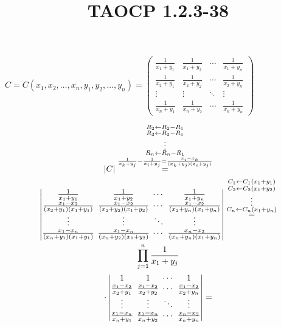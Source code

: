 \documentclass{article}
\title{TAOCP 1.2.3\mbox{-}38}
\begin{document}
\maketitle

\( C = C(x_{1},x_{2},\ldots,x_{n},y_{1},y_{2},\ldots,y_{n}) = \left(\begin{matrix} \frac{1}{x_{1}+y_{1}} & \frac{1}{x_{1}+y_{2}} & \cdots & \frac{1}{x_{1}+y_{n}} \\ \frac{1}{x_{2}+y_{1}} & \frac{1}{x_{2}+y_{2}} & \cdots & \frac{1}{x_{2}+y_{n}} \\ \vdots & \vdots & \ddots & \vdots \\ \frac{1}{x_{n}+y_{1}} & \frac{1}{x_{n}+y_{2}} & \cdots & \frac{1}{x_{n}+y_{n}} \end{matrix}\right) \)

\begin{multline*}
|C| \overset{\substack{R_{2} \leftarrow R_{2} - R_{1}\\R_{3} \leftarrow R_{3} - R_{1} \\ \vdots \\ R_{n} \leftarrow R_{n} - R_{1} \\ \frac{1}{x_{k} + y_{j}} - \frac{1}{x_{i} + y_{j}} = \frac{x_{i}-x_{k}}{(x_{k} + y_{j})(x_{i} + y_{j})}}}{=} \\
\left|\setlength{\arraycolsep}{2pt}\begin{matrix} \frac{1}{x_{1}+y_{1}} & \frac{1}{x_{1}+y_{2}} & \cdots & \frac{1}{x_{1}+y_{n}} \\ \frac{x_{1}-x_{2}}{(x_{2}+y_{1})(x_{1}+y_{1})} & \frac{x_{1}-x_{2}}{(x_{2}+y_{2})(x_{1}+y_{2})} & \cdots & \frac{x_{1}-x_{2}}{(x_{2}+y_{n})(x_{1}+y_{n})} \\ \vdots & \vdots & \ddots & \vdots \\ \frac{x_{1}-x_{n}}{(x_{n}+y_{1})(x_{1}+y_{1})} & \frac{x_{1}-x_{n}}{(x_{n}+y_{2})(x_{1}+y_{2})} & \cdots & \frac{x_{n}-x_{2}}{(x_{n}+y_{n})(x_{1}+y_{n})} \end{matrix}\right| \overset{\substack{C_{1} \leftarrow C_{1} (x_{1} + y_{1}) \\ C_{2} \leftarrow C_{2} (x_{1} + y_{2}) \\ \vdots \\ C_{n} \leftarrow C_{n} (x_{1} + y_{n}) }}{=} \\
\prod_{j=1}^{n}\frac{1}{x_{1}+y_{j}} \\
\cdot \left|\setlength{\arraycolsep}{2pt}\begin{matrix} 1 & 1 & \cdots & 1 \\ \frac{x_{1}-x_{2}}{x_{2}+y_{1}} & \frac{x_{1}-x_{2}}{x_{2}+y_{2}} & \cdots & \frac{x_{1}-x_{2}}{x_{2}+y_{n}} \\ \vdots & \vdots & \ddots & \vdots \\ \frac{x_{1}-x_{n}}{x_{n}+y_{1}} & \frac{x_{1}-x_{n}}{x_{n}+y_{2}} & \cdots & \frac{x_{n}-x_{2}}{x_{n}+y_{n}} \end{matrix}\right| =
\end{multline*}
\end{document}
